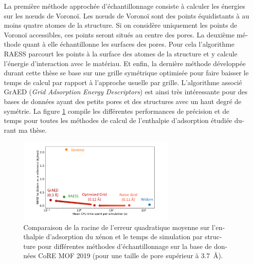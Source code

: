 \documentclass[thesis]{subfiles}
\begin{document}
\begin{otherlanguage}{french}
La première méthode approchée d'échantillonnage consiste à calculer les énergies sur les {n\oe{}uds} de Voronoï. Les n\oe{}uds de Voronoï sont des points équidistants à au moins quatre atomes de la structure. Si on considère uniquement les points de Voronoï accessibles, ces points seront situés au centre des pores. La deuxième méthode quant à elle échantillonne les surfaces des pores. Pour cela l'algorithme RAESS parcourt les points à la surface des atomes de la structure et y calcule l'énergie d'interaction avec le matériau. Et enfin, la dernière méthode développée durant cette thèse se base sur une grille symétrique optimisée pour faire baisser le temps de calcul par rapport à l'approche usuelle par grille. L'algorithme associé GrAED (\emph{Grid Adsorption Energy Descriptors}) est ainsi très intéressante pour des bases de données ayant des petits pores et des structures avec un haut degré de symétrie. La figure \ref{fgr:grid_perfomance} compile les différentes performances de précision et de temps pour toutes les méthodes de calcul de l'enthalpie d'adsorption étudiée durant ma thèse.

\begin{figure}[ht]
\centering
    \includegraphics[width=0.7\textwidth]{figures/3-fastsim/Grid_sumup.pdf}
    \caption{Comparaison de la racine de l'erreur quadratique moyenne sur l'enthalpie d'adsorption du xénon et le temps de simulation par structure pour différentes méthodes d'échantillonnage  sur la base de données CoRE MOF 2019 (pour une taille de pore supérieur à \SI{3.7}{\angstrom}). }\label{fgr:grid_perfomance}
\end{figure}


\end{otherlanguage}
\end{document}
